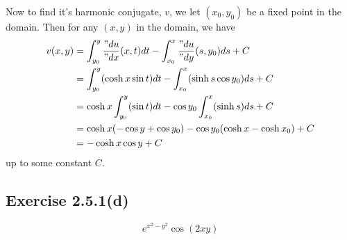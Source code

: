 \documentclass[12pt]{article}
\newenvironment{problem}
    {\begin{lrbox}{\mybox}\begin{minipage}{\textwidth-10pt}}
    {\end{minipage}\end{lrbox}\framebox[6.5in]{\usebox{\mybox}}}
\newcommand{\pd}[2]{\frac{"d#1}{"d#2}}
\begin{document}
Now to find it's harmonic conjugate, $v$, we let $(x_0,y_0)$ be a fixed point in the domain. Then for any $(x,y)$ in the domain, we have
\begin{align*}
    v(x,y)
        &= \int_{y_0}^y\pd ux (x,t) dt - \int_{x_0}^x\pd uy (s,y_0)ds + C \\
        &= \int_{y_0}^y(\cosh x \sin t) dt - \int_{x_0}^x(\sinh s \cos y_0)ds + C \\
        &= \cosh x \int_{y_0}^y(\sin t) dt -  \cos y_0\int_{x_0}^x(\sinh s)ds + C \\
        &= \cosh x(-\cos y + \cos y_0) - \cos y_0(\cosh x - \cosh x_0) + C\\
        &= -\cosh x \cos y + C
\end{align*}
up to some constant $C$.

\subsection*{Exercise 2.5.1(d)}
\begin{problem}
    \[e^{x^2-y^2}\cos(2xy)\]
\end{problem}
\paragraph{}
\end{document}
